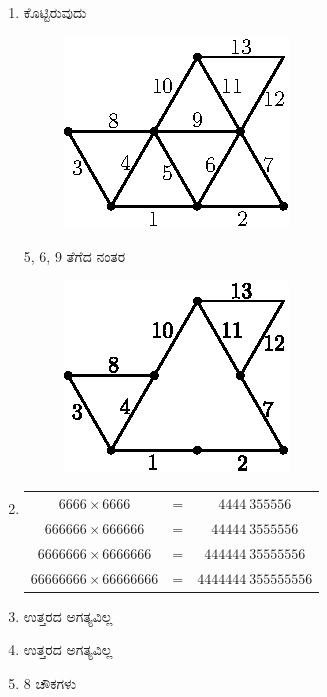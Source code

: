 \begin{enumerate}
\item ಕೊಟ್ಟಿರುವುದು 

\begin{minipage}[c]{5cm}
\begin{figure}[H]
\centering
\includegraphics{images/chap2/q16.eps}
\end{figure}
\end{minipage}
\begin{minipage}[c]{4cm}
5, 6, 9 ತೆಗೆದ ನಂತರ 
\begin{figure}[H]
\centering
\includegraphics{images/chap2/ans16.eps}
\end{figure}
\end{minipage}

\item 
\begin{tabular}[t]{ccc}
$6666 \times 6666$ & = & $4444 ~355556$\\
$666666 \times 666666$ & = & $44444 ~3555556$\\
$6666666 \times 6666666$ & = & $444444~ 35555556$\\
$66666666 \times 66666666$ & = & $4444444~ 355555556$
\end{tabular}

\item ಉತ್ತರದ ಅಗತ್ಯವಿಲ್ಲ 

\item ಉತ್ತರದ ಅಗತ್ಯವಿಲ್ಲ 

\item 8 ಚೌಕಗಳು 


\end{enumerate}
